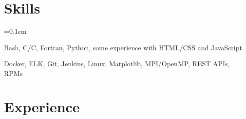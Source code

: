 \documentclass[11pt,letterpaper]{article}
\newcommand{\ResumeSection}[1]{
    \section*{ {\color{MidnightBlue}#1 \sout{\hfill} } }
}
\newcommand{\CPP}{C\nolinebreak[4]\hspace{-.05em}\raisebox{.22ex}{\footnotesize\bf ++}\xspace}
\begin{document}

\ResumeSection{Skills}

\begin{description}[leftmargin=!, labelindent=\parindent,
                    labelwidth=\widthof{\bfseries Languages}]
    \parskip=0.1em

    \item[Languages]
        Bash, C/\CPP, Fortran, Python, some experience with HTML/CSS and JavaScript

    \item[Tools]
        Docker, ELK, Git, Jenkins, Linux, Matplotlib, MPI/OpenMP, REST APIs, RPMs

\end{description}



\ResumeSection{Experience}
\end{document}

